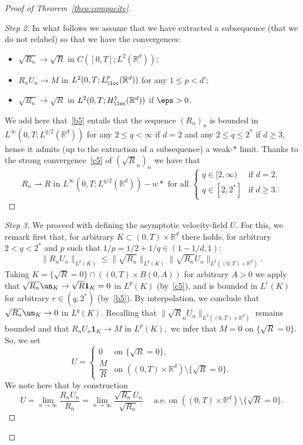 \begin{proof}[Proof of Theorem~\ref{theo:compacite}]
\begin{proof}[Step 2]
\goodbreak
In what follows we assume that we have extracted a subsequence (that we do not relabel) so that we have the convergences:
\begin{itemize}
\item $\sqrt{R_n} \to \sqrt{R}$ in $C([0,T];L^2(\mathbb R^d))$;
\item $R_n U_n \to M$ in $L^2(0,T;L^p_{\loc}(\mathbb R^d))$ for any $1 \le p < d'$;
\item $\sqrt{R_n} \to \sqrt{R}$ in $L^2(0,T;H^{1}_{\loc}(\mathbb R^d))$ if $\eps > 0$.
\end{itemize}
We add here that~\eqref{b5} entails that the sequence $(R_n)_{n}$ is bounded in\linebreak $L^{\infty}(0,T;L^{q/2}(\mathbb R^d))$ for any $2\le q < \infty$ if $d=2$ and any $2 \le q \le 2^*$ if $d \ge 3$, hence it admits (up to the extraction of a subsequence) a weak-$*$ limit. Thanks to the strong convergence~\eqref{c5} of $(\sqrt{R}_n)_n$ we have that
\begin{equation*}\label{eq_cvgcdensity}
\tag{c7}
R_n \rightharpoonup R \text{ in $L^{\infty}(0,T;L^{q/2}(\mathbb R^d))-w*$ for all }
\begin{cases}
q \in [2,\infty) &\text{if } d = 2, \\
q \in [2,2^*] &\text{if } d \ge 3.
\end{cases}
\end{equation*}
\let\qed\relax
\end{proof}

\begin{proof}[Step 3]
We proceed with defining the asymptotic velocity-field $U.$ For this, we remark first that, for arbitrary $K\subset (0,T) \times \mathbb R^d$ there holds, for arbitrary $ 2 < q <2^*$ and $p$ such that $1/p= 1/2 + 1/q \in (1 - 1/d,1):$
\[
\|R_n U_n\|_{L^p(K)} \le \|\sqrt{R_n}\|_{L^{q}(K)} \|\sqrt{R_n} U_n\|_{L^2((0,T) \times \mathbb R^d)}.
\]
Taking $K = \{\sqrt{R} =0\} \cap \left((0,T) \times B(0,A)\right)$ for arbitrary $A >0$ we apply that $\sqrt{R_n} \un_{K} \to \sqrt R \mathbf 1_K = 0$ in $L^p(K)$ (by~\eqref{c5}), and is bounded in $L^{r}(K)$ for arbitrary $r \in (q,2^*)$ (by~\eqref{b5}). By interpolation, we conclude that $\sqrt{R_n} \un_{K} \to 0$ in $L^q(K).$ Recalling that $\|\sqrt{R}_n U_n\|_{L^2((0,T) \times \mathbb R^d)}$ remains bounded and that $R_n U_n \mathbf 1_{K} \to M$ in $L^p(K),$ we infer that $M = 0$ on $\{\sqrt{R}=0\}.$ So, we set
\[
U=\begin{cases}
0 & \text{on }\{\sqrt{R} = 0\},\\
\dfrac{M}{R} & \text{on }\left((0,T) \times \mathbb R^d\right) \setminus \{\sqrt{R} = 0\}.
\end{cases}
\]
We note here that by construction
\[
U = \lim_{n \to \infty} \dfrac{R_n U_n}{R_n} = \lim_{n \to \infty}
\dfrac{\sqrt{R_n} U_n}{\sqrt{R_n}} \quad \text{ a.e. on $\left((0,T)
\times \mathbb R^d\right) \setminus \{\sqrt{R} = 0\}$}.
\]


\end{proof}
\end{proof}
